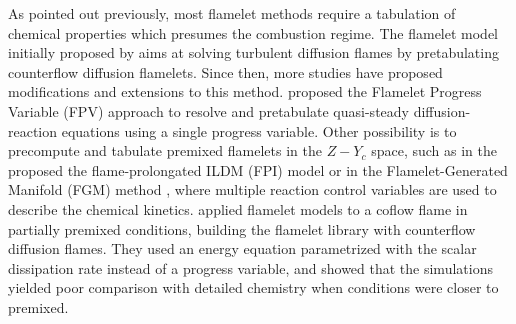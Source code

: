 \documentclass[preprint,12pt,authoryear]{elsarticle}
\begin{document}
As pointed out previously, most flamelet methods require a tabulation of chemical properties which presumes the combustion regime. The flamelet model initially proposed by \cite{peters_laminar_1984} aims at solving turbulent diffusion flames by pretabulating counterflow diffusion flamelets. Since then, more studies have proposed modifications and extensions to this method. \cite{pierce_progress-variable_2004} proposed the Flamelet Progress Variable (FPV) approach to resolve and pretabulate quasi-steady diffusion-reaction equations using a single progress variable. Other possibility is to precompute and tabulate premixed flamelets in the $Z-Y_c$ space, such as in the proposed the flame-prolongated ILDM (FPI) model \citep{gicquel_laminar_2000} or in the Flamelet-Generated Manifold (FGM) method \citep{van_oijen_modelling_2000}, where multiple reaction control variables are used to describe the chemical kinetics. \cite{consul_analysis_2008} applied flamelet models to a coflow flame in partially premixed conditions, building the flamelet library with  counterflow diffusion flames. They used an energy equation parametrized with the scalar dissipation rate instead of a progress variable, and showed that the simulations yielded poor comparison with detailed chemistry when conditions were closer to premixed.
\end{document}
